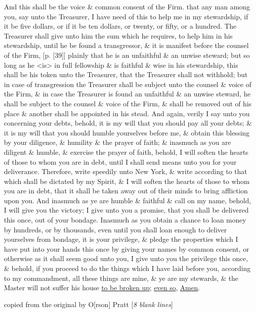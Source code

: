 					And this shall be the voice \& common consent of the Firm. that any man among you, say unto the Treasurer, I have need of this to help me in my stewardship, if it be five dollars, or if it be ten dollars, or twenty, or fifty, or a hundred. The Treasurer shall give unto him the sum which he requires, to help him in his stewardship, until he be found a transgressor, \& it is manifest before the counsel of the Firm, [p. [39]] plainly that he is an unfaithful \& an unwise steward; but so long as he <is> in full fellowship \& is faithful \& wise in his stewardship, this shall be his token unto the Treasurer, that the Treasurer shall not withhold; but in case of transgression the Treasurer shall be subject unto the counsel \& voice of the Firm, \& in case the Treasurer is found an unfaithful \& an unwise steward, he shall be subject to the counsel \& voice of the Firm, \& shall be removed out of his place \& another shall be appointed in his stead. And again, verily I say unto you concerning your debts, behold, it is my will that you should pay all your debts; \& it is my will that you should humble yourselves before me, \& obtain this blessing by your diligence, \& humility \& the prayer of faith; \& inasmuch as you are diligent \& humble, \& exercise the prayer of faith, behold, I will soften the hearts of those to whom you are in debt, until I shall send means unto you for your deliverance. Therefore, write speedily unto New York, \& write according to that which shall be dictated by my Spirit, \& I will soften the hearts of those to whom you are in debt, that it shall be taken away out of their minds to bring affliction upon you. And inasmuch as ye are humble \& faithful \& call on my name, behold, I will give you the victory; I give unto you a promise, that you shall be delivered this once, out of your bondage. Inasmuch as you obtain a chance to loan money by hundreds, or by thousands, even until you shall loan enough to deliver yourselves from bondage, it is your privilege, \& pledge the properties which I have put into your hands this once by giving your names by common consent, or otherwise as it shall seem good unto you, I give unto you the privilege this once, \& behold, if you proceed to do the things which I have laid before you, according to my commandment, all these things are mine, \& ye are my stewards, \& the Master will not suffer his house \uline{to be broken up}; \uline{even so}, \uline{Amen}.

					copied from the original by O[rson] Pratt [\textit{8 blank lines}]
					
